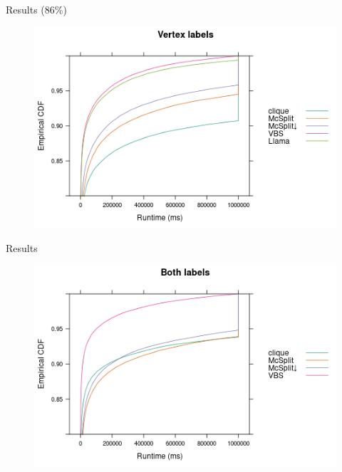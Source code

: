 \documentclass{beamer}
\begin{document}
\begin{frame}{Results (86\%)}
  \begin{figure}
    \centering
    \includegraphics[width=\textwidth]{../dissertation/images/ecdf_vertex_labels_llama.png}
  \end{figure}
\end{frame}

\begin{frame}{Results}
  \begin{figure}
    \centering
    \includegraphics[width=\textwidth]{../dissertation/images/ecdf_both_labels.png}
  \end{figure}
\end{frame}
\end{document}
